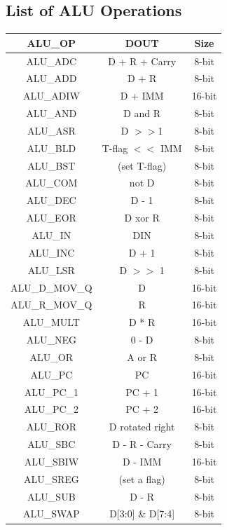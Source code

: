\documentclass[12pt,a4paper]{report}
\begin{document}
\subsection{List of ALU Operations}
\begin{center}
  \begin{tabular}{|c|c|c|}
    \hline
    ALU\_OP &  DOUT &  Size \\ \hline
    ALU\_ADC & D + R + Carry  & 8-bit \\ \hline
    ALU\_ADD & D + R  & 8-bit \\ \hline
    ALU\_ADIW & D + IMM  & 16-bit \\ \hline
    ALU\_AND & D and R  & 8-bit \\ \hline
    ALU\_ASR & D $>>$1  & 8-bit \\ \hline
    ALU\_BLD & T-flag $<<$ IMM  & 8-bit \\ \hline
    ALU\_BST & (set T-flag)  & 8-bit \\ \hline
    ALU\_COM & not D  & 8-bit \\ \hline
    ALU\_DEC & D - 1  & 8-bit \\ \hline
    ALU\_EOR & D xor R  & 8-bit \\ \hline
    ALU\_IN & DIN  & 8-bit \\ \hline
    ALU\_INC & D + 1  & 8-bit \\ \hline
    ALU\_LSR & D $>>$ 1  & 8-bit \\ \hline
    ALU\_D\_MOV\_Q & D  & 16-bit \\ \hline
    ALU\_R\_MOV\_Q & R  & 16-bit \\ \hline
    ALU\_MULT & D * R  & 16-bit \\ \hline
    ALU\_NEG & 0 - D  & 8-bit \\ \hline
    ALU\_OR & A or R  & 8-bit \\ \hline
    ALU\_PC & PC  & 16-bit \\ \hline
    ALU\_PC\_1 & PC + 1  & 16-bit \\ \hline
    ALU\_PC\_2 & PC + 2  & 16-bit \\ \hline
    ALU\_ROR & D rotated right  & 8-bit \\ \hline
    ALU\_SBC & D - R - Carry  & 8-bit \\ \hline
    ALU\_SBIW & D - IMM  & 16-bit \\ \hline
    ALU\_SREG & (set a flag)  & 8-bit \\ \hline
    ALU\_SUB & D - R  & 8-bit \\ \hline
    ALU\_SWAP & D[3:0] \& D[7:4]  & 8-bit \\ \hline
  \end{tabular}
\end{center}
\end{document}
